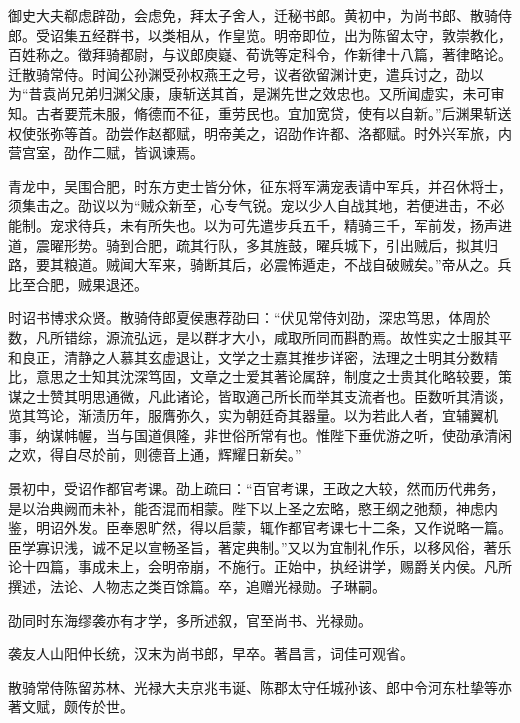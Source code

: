 \documentclass[12pt,UTF8]{ctexbook}
\begin{document}
御史大夫郗虑辟劭，会虑免，拜太子舍人，迁秘书郎。黄初中，为尚书郎、散骑侍郎。受诏集五经群书，以类相从，作皇览。明帝即位，出为陈留太守，敦崇教化，百姓称之。徵拜骑都尉，与议郎庾嶷、荀诜等定科令，作新律十八篇，著律略论。迁散骑常侍。时闻公孙渊受孙权燕王之号，议者欲留渊计吏，遣兵讨之，劭以为“昔袁尚兄弟归渊父康，康斩送其首，是渊先世之效忠也。又所闻虚实，未可审知。古者要荒未服，脩德而不征，重劳民也。宜加宽贷，使有以自新。”后渊果斩送权使张弥等首。劭尝作赵都赋，明帝美之，诏劭作许都、洛都赋。时外兴军旅，内营宫室，劭作二赋，皆讽谏焉。

青龙中，吴围合肥，时东方吏士皆分休，征东将军满宠表请中军兵，并召休将士，须集击之。劭议以为“贼众新至，心专气锐。宠以少人自战其地，若便进击，不必能制。宠求待兵，未有所失也。以为可先遣步兵五千，精骑三千，军前发，扬声进道，震曜形势。骑到合肥，疏其行队，多其旌鼓，曜兵城下，引出贼后，拟其归路，要其粮道。贼闻大军来，骑断其后，必震怖遁走，不战自破贼矣。”帝从之。兵比至合肥，贼果退还。

时诏书博求众贤。散骑侍郎夏侯惠荐劭曰：“伏见常侍刘劭，深忠笃思，体周於数，凡所错综，源流弘远，是以群才大小，咸取所同而斟酌焉。故性实之士服其平和良正，清静之人慕其玄虚退让，文学之士嘉其推步详密，法理之士明其分数精比，意思之士知其沈深笃固，文章之士爱其著论属辞，制度之士贵其化略较要，策谋之士赞其明思通微，凡此诸论，皆取適己所长而举其支流者也。臣数听其清谈，览其笃论，渐渍历年，服膺弥久，实为朝廷奇其器量。以为若此人者，宜辅翼机事，纳谋帏幄，当与国道俱隆，非世俗所常有也。惟陛下垂优游之听，使劭承清闲之欢，得自尽於前，则德音上通，辉耀日新矣。”

景初中，受诏作都官考课。劭上疏曰：“百官考课，王政之大较，然而历代弗务，是以治典阙而未补，能否混而相蒙。陛下以上圣之宏略，愍王纲之弛颓，神虑内鉴，明诏外发。臣奉恩旷然，得以启蒙，辄作都官考课七十二条，又作说略一篇。臣学寡识浅，诚不足以宣畅圣旨，著定典制。”又以为宜制礼作乐，以移风俗，著乐论十四篇，事成未上，会明帝崩，不施行。正始中，执经讲学，赐爵关内侯。凡所撰述，法论、人物志之类百馀篇。卒，追赠光禄勋。子琳嗣。

劭同时东海缪袭亦有才学，多所述叙，官至尚书、光禄勋。

袭友人山阳仲长统，汉末为尚书郎，早卒。著昌言，词佳可观省。

散骑常侍陈留苏林、光禄大夫京兆韦诞、陈郡太守任城孙该、郎中令河东杜挚等亦著文赋，颇传於世。
\end{document}
